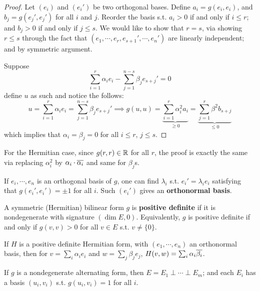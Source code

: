 \documentclass{article}
\begin{document}
\begin{proof}
    Let $(e_i)$ and $(e_i')$ be two orthogonal bases. Define $a_i = g(e_i, e_i)$, and $b_j = g(e_j', e_j')$ for all $i$ and $j$. Reorder the basis s.t. $a_i > 0$ if and only if $i \leq r$; and $b_j > 0$ if and only if $j \leq s$. We would like to show that $r = s$, via showing $r \leq s$ through the fact that $(e_1, \cdots, e_r, e_{s+1}', \cdots, e_n')$ are linearly independent; and by symmetric argument.

    Suppose
    \[
        \sum_{i=1}^r \alpha_i e_i - \sum_{j = 1}^{n-s} \beta_j e_{s+j}' = 0
    \]
    define $u$ as such and notice the follows:
    \[
        u = \sum_{i=1}^r \alpha_i e_i = \sum_{j = 1}^{n-s} \beta_j e_{s+j}' \implies g(u, u) = \underbrace{\sum_{i=1}^r \alpha_i^2 a_i}_{\geq 0} = \underbrace{\sum_{j=1}^r \beta^2 b_{s+j}}_{\leq 0}
    \]
    which implies that $\alpha_i = \beta_j = 0$ for all $i \leq r$, $j \leq s$.
\end{proof}

\begin{remark}
    For the Hermitian case, since $g(r, r) \in \mathbb{R}$ for all $r$, the proof is exactly the same via replacing $\alpha_i^2$ by $\alpha_i \cdot \overline{\alpha_i}$ and same for $\beta_j$s.
\end{remark}

\begin{remark}
    If $e_i, \cdots, e_n$ is an orthogonal basis of $g$, one can find $\lambda_i$ s.t. $e_i' = \lambda_i e_i$ satisfying that $g(e_i', e_i') = \pm 1$ for all $i$. Such $(e_i')$ gives an \textbf{orthonormal basis}.
\end{remark}

\begin{definition}
    A symmetric (Hermitian) bilinear form $g$ is \textbf{positive definite} if it is nondegenerate with signature $(\dim E, 0)$. Equivalently, $g$ is positive definite if and only if $g(v, v) > 0$ for all $v \in E$ s.t. $v \neq \{0\}$.
\end{definition}

\begin{example}
    If $H$ is a positive definite Hermitian form, with $(e_1, \cdots, e_n)$ an orthonormal basis, then for $v = \sum_i \alpha_i e_i$ and $w = \sum_j \beta_j e_j$, $H(v, w) = \sum_i \alpha_i \overline{\beta_i}$.
\end{example}

\begin{proposition}
    If $g$ is a nondegenerate alternating form, then $E = E_1 \perp \cdots \perp E_m$; and each $E_i$ has a basis $(u_i, v_i)$ s.t. $g(u_i, v_i) = 1$ for all $i$. 
\end{proposition}
\end{document}
